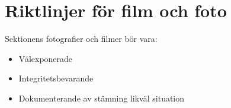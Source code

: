 \documentclass[]{dsekprotokoll}
\begin{document}
\section{Riktlinjer för film och foto}
Sektionens fotografier och filmer bör vara:
\begin{itemize}
    \item Välexponerade
    \item Integritetsbevarande
    \item Dokumenterande av stämning likväl situation
\end{itemize}



\end{document}
